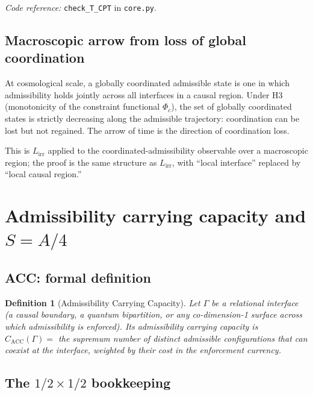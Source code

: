 \documentclass[11pt]{article}
\newtheorem{definition}[theorem]{Definition}
\theoremstyle{remark}
\newcommand{\coderef}[2]{\smallskip\noindent\textit{Code reference:} \texttt{#1} in \texttt{#2}.}
\begin{document}
\coderef{check\_T\_CPT}{core.py}

\subsection{Macroscopic arrow from loss of global coordination}

\begin{tcolorbox}[apfbox, title={Proposition 5.4 (Macroscopic arrow)}]
At cosmological scale, a globally coordinated admissible state is one in
which admissibility holds jointly across all interfaces in a causal region.
Under H3 (monotonicity of the constraint functional $\Phi_c$), the set of
globally coordinated states is strictly decreasing along the admissible
trajectory: coordination can be lost but not regained.  The arrow of time
is the direction of coordination loss.
\end{tcolorbox}

\noindent This is $L_{\mathrm{irr}}$ applied to the coordinated-admissibility
observable over a macroscopic region; the proof is the same structure as
$L_{\mathrm{irr}}$, with ``local interface'' replaced by ``local causal
region.''


\section{Admissibility carrying capacity and $S = A/4$}
\label{sec:ACC}

\subsection{ACC: formal definition}

\begin{definition}[Admissibility Carrying Capacity]
Let $\Gamma$ be a relational interface (a causal boundary, a quantum
bipartition, or any co-dimension-1 surface across which admissibility is
enforced).  Its admissibility carrying capacity is
$C_{\mathrm{ACC}}(\Gamma) = $ the supremum number of distinct admissible
configurations that can coexist at the interface, weighted by their
cost in the enforcement currency.
\end{definition}

\subsection{The $1/2 \times 1/2$ bookkeeping}
\end{document}
